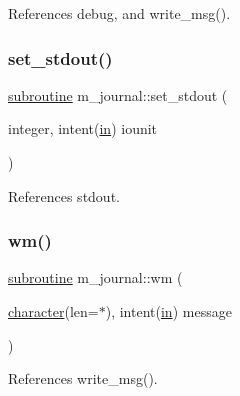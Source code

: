 References debug, and write\+\_\+msg().

\mbox{\label{namespacem__journal_a0f2ac99f3da62381d2466c150830b9e0}} 
\subsubsection{\texorpdfstring{set\+\_\+stdout()}{set\_stdout()}}
{\footnotesize\ttfamily \hyperlink{M__stopwatch_83_8txt_acfbcff50169d691ff02d4a123ed70482}{subroutine} m\+\_\+journal\+::set\+\_\+stdout (\begin{DoxyParamCaption}\item[{integer, intent(\hyperlink{M__journal_83_8txt_afce72651d1eed785a2132bee863b2f38}{in})}]{iounit }\end{DoxyParamCaption})\hspace{0.3cm}{\ttfamily [private]}}



References stdout.

\mbox{\label{namespacem__journal_a98479e5ace98340f7519470b96d3197d}} 
\subsubsection{\texorpdfstring{wm()}{wm()}}
{\footnotesize\ttfamily \hyperlink{M__stopwatch_83_8txt_acfbcff50169d691ff02d4a123ed70482}{subroutine} m\+\_\+journal\+::wm (\begin{DoxyParamCaption}\item[{\hyperlink{option__stopwatch_83_8txt_abd4b21fbbd175834027b5224bfe97e66}{character}(len=$\ast$), intent(\hyperlink{M__journal_83_8txt_afce72651d1eed785a2132bee863b2f38}{in})}]{message }\end{DoxyParamCaption})\hspace{0.3cm}{\ttfamily [private]}}



References write\+\_\+msg().

\mbox{\label{namespacem__journal_ae4e688044197dd70bd47b4d7c0bb7306}} 
